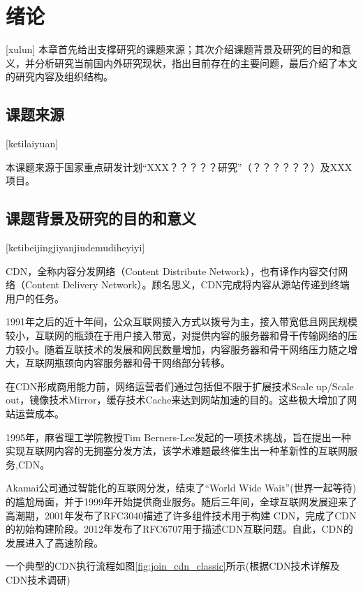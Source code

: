 
\chapter[绪论]{绪论}[xulun]
本章首先给出支撑研究的课题来源；其次介绍课题背景及研究的目的和意义，并分析研究当前国内外研究现状，指出目前存在的主要问题，最后介绍了本文的研究内容及组织结构。

\section{课题来源}[ketilaiyuan]

本课题来源于国家重点研发计划“XXX？？？？？研究”（？？？？？？）及XXX项目。

\section{课题背景及研究的目的和意义}[ketibeijingjiyanjiudemudiheyiyi]





CDN，全称内容分发网络（Content Distribute Network），也有译作内容交付网络（Content Delivery Network）。顾名思义，CDN完成将内容从源站传递到终端用户的任务。

1991年之后的近十年间，公众互联网接入方式以拨号为主，接入带宽低且网民规模较小，互联网的瓶颈在于用户接入带宽，对提供内容的服务器和骨干传输网络的压力较小。随着互联技术的发展和网民数量增加，内容服务器和骨干网络压力随之增大，互联网瓶颈向内容服务器和骨干网络部分转移。

在CDN形成商用能力前，网络运营者们通过包括但不限于扩展技术Scale up/Scale out，镜像技术Mirror，缓存技术Cache来达到网站加速的目的。这些极大增加了网站运营成本。

1995年，麻省理工学院教授Tim Berners-Lee发起的一项技术挑战，旨在提出一种实现互联网内容的无拥塞分发方法，该学术难题最终催生出一种革新性的互联网服务,CDN。

Akamai公司通过智能化的互联网分发，结束了“World Wide Wait”(世界一起等待)的尴尬局面，并于1999年开始提供商业服务。随后三年间，全球互联网发展迎来了高潮期，2001年发布了RFC3040\cite{RFC-3040}描述了许多组件技术用于构建 CDN，完成了CDN的初始构建阶段。2012年发布了RFC6707\cite{RFC-6707}用于描述CDN互联问题。自此，CDN的发展进入了高速阶段。 


一个典型的CDN执行流程如图\ref{fig:join_cdn_classic}所示(根据CDN技术详解\cite{leibaohua-CDN-2012}及CDN技术调研\cite{Pathan-survey-2007})


